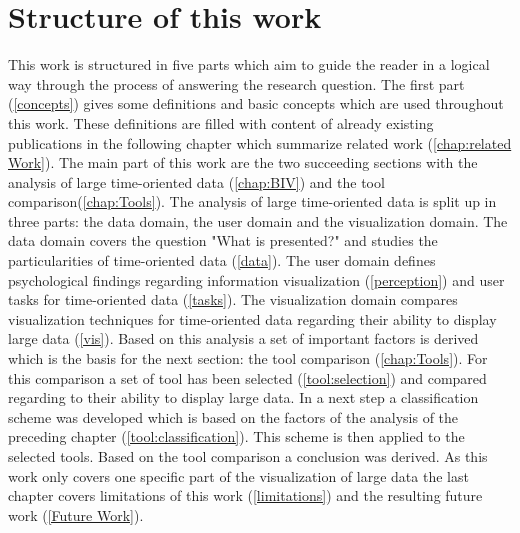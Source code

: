 \section{Structure of this work}
This work is structured in five parts which aim to guide the reader in a logical way through the process of answering the research question. The first part (\ref{concepts}) gives some definitions and basic concepts which are used throughout this work. These definitions are filled with content of already existing publications in the following chapter which summarize related work (\ref{chap:related Work}). The main part of this work are the two succeeding sections with the analysis of large time-oriented data (\ref{chap:BIV}) and the tool comparison(\ref{chap:Tools}). The analysis of large time-oriented data is split up in three parts: the data domain, the user domain and the visualization domain. The data domain covers the question "What is presented?" and studies the particularities of time-oriented data (\ref{data}). The user domain defines psychological findings regarding information visualization  (\ref{perception}) and user tasks for time-oriented data (\ref{tasks}). The visualization domain compares visualization techniques for time-oriented data regarding their ability to display large data (\ref{vis}). Based on this analysis a set of important factors is derived which is the basis for the next section: the tool comparison (\ref{chap:Tools}). For this comparison a set of tool has been selected (\ref{tool:selection}) and compared regarding to their ability to display large data. In a next step a  classification scheme was developed which is based on the factors of the analysis of the preceding chapter (\ref{tool:classification}). This scheme is then applied to the selected tools.
Based on the tool comparison a conclusion was derived.
As this work only covers one specific part of the visualization of large data the last chapter covers limitations of this work (\ref{limitations}) and the resulting future work (\ref{Future Work}).